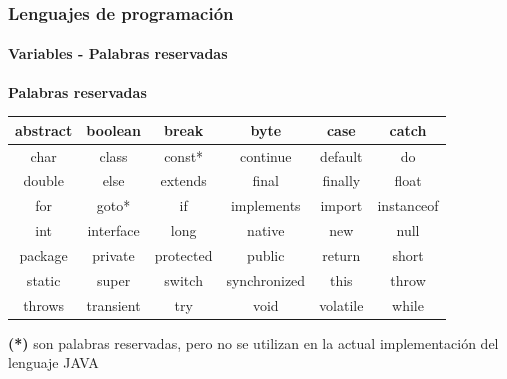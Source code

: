 \documentclass{beamer}
\begin{document}
\begin{frame}
  \frametitle{Lenguajes de programación}
  \framesubtitle{Variables - Palabras reservadas}

  \textbf{Palabras reservadas}
  \begin{center}
    \begin{tabular}{|c|c|c|c|c|c|} \hline
      abstract    & boolean & break         & byte                 & case     & catch        \\ \hline
      char          & class       & const*        & continue         & default & do              \\ \hline
      double     & else         & extends     & final                 & finally   & float \\ \hline
      for             & goto*       & if                 & implements    & import  & instanceof \\ \hline
      int             & interface  & long          & native              & new      & null \\ \hline
      package  & private     & protected & public              & return   & short \\ \hline
      static        & super       & switch       & synchronized & this       & throw \\ \hline
      throws      & transient & try              & void                  & volatile & while \\ \hline
    \end{tabular}
  \end{center}
  \textbf{(*)} son palabras reservadas, pero no se utilizan en la actual implementación del lenguaje JAVA
\end{frame}
\end{document}
